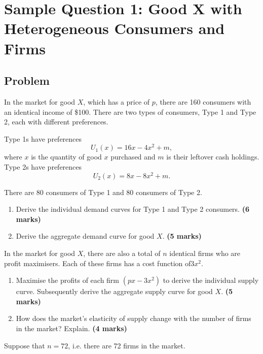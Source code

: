 \documentclass[12pt]{article}
\begin{document}

\newpage
\section{Sample Question 1: Good X with Heterogeneous Consumers and Firms}

\subsection{Problem}

\noindent
In the market for good \(X\), which has a price of \(p\), there are 160 consumers with an identical income of \$100. There are two types of consumers, Type 1 and Type 2, each with different preferences.

\noindent
Type 1s have preferences
\[
U_1(x)=16x-4x^2+m,
\]
where \(x\) is the quantity of good \(x\) purchased and \(m\) is their leftover cash holdings. Type 2s have preferences
\[
U_2(x)=8x-8x^2+m.
\]

\bigskip
\noindent There are 80 consumers of Type 1 and 80 consumers of Type 2.

\begin{enumerate}[label=(\alph*)]
    \item Derive the individual demand curves for Type 1 and Type 2 consumers. \hfill \textbf{(6 marks)}
    \item Derive the aggregate demand curve for good \(X\). \hfill \textbf{(5 marks)}
\end{enumerate}


\bigskip
\noindent
In the market for good \(X\), there are also a total of \(n\) identical firms who are profit maximisers. Each of these firms has a cost function of$3x^2.$
\begin{enumerate}[label=(\alph*), start=3]
    \item Maximise the profits of each firm \((px-3x^2)\) to derive the individual supply curve. Subsequently derive the aggregate supply curve for good \(X\). \hfill \textbf{(5 marks)}
    \item How does the market’s elasticity of supply change with the number of firms in the market? Explain. \hfill \textbf{(4 marks)}
\end{enumerate}

\bigskip
\noindent
Suppose that \(n=72\), i.e. there are 72 firms in the market.
\end{document}
